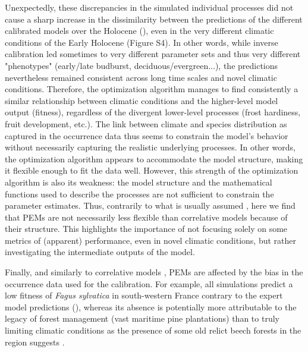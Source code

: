 \documentclass[preprint,12pt,authoryear]{elsarticle}
\begin{document}
{Unexpectedly, these discrepancies in the simulated individual processes did not cause a sharp increase in the dissimilarity between the predictions of the different calibrated models over the Holocene (), even in the very different climatic conditions of the Early Holocene (Figure S4). In other words, while inverse calibration led sometimes to very different parameter sets and thus very different "phenotypes" (early/late budburst, deciduous/evergreen...), the predictions nevertheless remained consistent across long time scales and novel climatic conditions. Therefore, the optimization algorithm manages to find consistently a similar relationship between climatic conditions and the higher-level model output (fitness), regardless of the divergent lower-level processes (frost hardiness, fruit development, etc.). The link between climate and species distribution as captured in the occurrence data thus seems to constrain the model's behavior without necessarily capturing the realistic underlying processes. In other words, the optimization algorithm appears to accommodate the model structure, making it flexible enough to fit the data well. However, this strength of the optimization algorithm is also its weakness: the model structure and the mathematical functions used to describe the processes are not sufficient to constrain the parameter estimates. Thus, contrarily to what is usually assumed \citep{Higgins2020}, here we find that PEMs are not necessarily less flexible than correlative models because of their structure. This highlights the importance of not focusing solely on some metrics of (apparent) performance, even in novel climatic conditions, but rather investigating the intermediate outputs of the model.

Finally, and similarly to correlative models \citep{BarbetMassin2010, Duputie2014},  PEMs are affected by the bias in the occurrence data used for the calibration. For example, all simulations predict a low fitness of \emph{Fagus sylvatica} in south-western France contrary to the expert model predictions (), whereas its absence is potentially more attributable to the legacy of forest management (vast maritime pine plantations) than to truly limiting climatic conditions as the presence of some old relict beech forests in the region suggests \citep{Lafontaine2014}.

}
\end{document}
